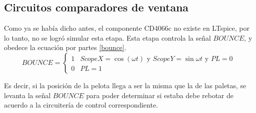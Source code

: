 \subsection{Circuitos comparadores de ventana}

Como ya se había dicho antes, el componente CD4066c no existe en LTspice, por lo tanto, no se logró simular esta etapa.
Esta etapa controla la señal $BOUNCE$, y obedece la ecuación por partes \eqref{bounce}.
\begin{equation}
    BOUNCE = \begin{cases}
        1           & ScopeX = \cos(\omega t)\text{ y } ScopeY=\sin{\omega t}\text{ y }PL = 0\\
        0           & PL = 1
    \end{cases}\label{bounce}
\end{equation}

Es decir, si la posición de la pelota llega a ser la misma que la de las paletas, se levanta la señal $BOUNCE$ para poder determinar si estaba debe rebotar de acuerdo a la circuitería de control correspondiente. 

